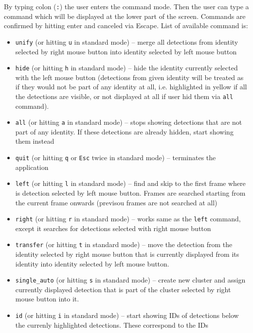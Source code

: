 By typing colon (\verb+:+) the user enters the command mode. Then the user can type
a command which will be displayed at the lower part of the screen. Commands are confirmed
by hitting enter and canceled via Escape. List of available command is:

\begin{itemize}
    \item \verb+unify+ (or hitting \verb+u+ in standard mode) -- merge all detections
    from identity selected by right mouse button into identity selected by left mouse 
    button
    \item \verb+hide+ (or hitting \verb+h+ in standard mode) -- hide the identity
    currently selected with the left mouse button (detections from given identity
    will be treated as if they would not be part of any identity at all, i.e.
    highlighted in yellow if all the detections are visible, or not displayed at all
    if user hid them via \verb+all+ command).
    \item \verb+all+ (or hitting \verb+a+ in standard mode) -- stops showing detections
    that are not part of any identity. If these detections are already hidden, start
    showing them instead
    \item \verb+quit+ (or hitting \verb+q+ or \verb+Esc+ twice in standard mode) -- terminates
    the application
    \item \verb+left+ (or hitting \verb+l+ in standard mode) -- find and skip to the
    first frame where is detection selected by left mouse button. Frames are searched
    starting from the current frame onwards (previsou frames are not searched at all)
    \item \verb+right+ (or hitting \verb+r+ in standard mode) -- works same as the 
    \verb+left+ command, except it searches for detections selected with right mouse
    button
    \item \verb+transfer+ (or hitting \verb+t+ in standard mode) -- move the detection
    from the identity selected by right mouse button that is currently displayed from
    its identity into identity selected by left mouse button.
    \item \verb+single_auto+ (or hitting \verb+s+ in standard mode) -- create new
    cluster and assign currently displayed detection that is part of the
    cluster selected by right mouse button into it.
    \item \verb+id+ (or hitting \verb+i+ in standard mode) -- start showing IDs of
    detections below the currenly highlighted detections. These correspond to the IDs

\end{itemize}
